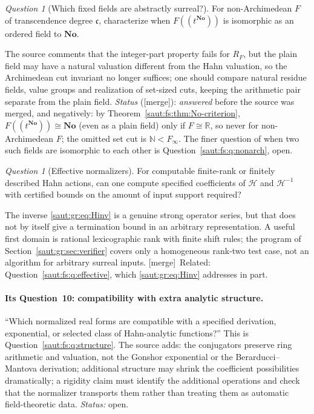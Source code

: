 \documentclass[11pt]{article}
\theoremstyle{definition}
\theoremstyle{remark}
\newtheorem{question}[theorem]{Question}
\newcommand{\No}{\mathbf{No}}
\newcommand{\R}{\mathbb R}
\newcommand{\N}{\mathbb N}
\newcommand{\cc}{\mathfrak c}
\newcommand{\mergetag}{\textup{[merge]}}
\numberwithin{equation}{section}
\begin{document}
\begin{question}[Which fixed fields are abstractly surreal?]\label{saut:gr:q:abstract}
For non-Archimedean $F$ of transcendence degree $\cc$, characterize when $F((t^{\No}))$
is isomorphic as an ordered field to $\No$.
\end{question}
The source comments that the integer-part property fails for $R_F$, but the plain field
may have a natural valuation different from the Hahn valuation, so the Archimedean cut
invariant no longer suffices; one should compare natural residue fields, value groups
and realization of set-sized cuts, keeping the arithmetic pair separate from the plain
field. \emph{Status} (\mergetag): \emph{answered} before the source was merged, and
negatively: by Theorem~\ref{saut:fs:thm:No-criterion}, $F((t^{\No}))\cong\No$ (even as a
plain field) only if $F\cong\R$, so never for non-Archimedean $F$; the omitted set cut is
$\N<F_\infty$. The finer question of when two such fields are isomorphic to each other is
Question~\ref{saut:fs:q:nonarch}, open.

\begin{question}[Effective normalizers]\label{saut:gr:q:effective}
For computable finite-rank or finitely described Hahn actions, can one compute specified
coefficients of $\mathcal H$ and $\mathcal H^{-1}$ with certified bounds on the amount of
input support required?
\end{question}
The inverse \eqref{saut:gr:eq:Hinv} is a genuine strong operator series, but that does not
by itself give a termination bound in an arbitrary representation. A useful first domain
is rational lexicographic rank with finite shift rules; the program of
Section~\ref{saut:gr:sec:verifier} covers only a homogeneous rank-two test case, not an
algorithm for arbitrary surreal inputs. \mergetag\ Related:
Question~\ref{saut:fs:q:effective}, which \eqref{saut:gr:eq:Hinv} addresses in part.

\paragraph{Its Question~10: compatibility with extra analytic structure.} ``Which
normalized real forms are compatible with a specified derivation, exponential, or selected
class of Hahn-analytic functions?'' This is Question~\ref{saut:fs:q:structure}. The source
adds: the conjugators preserve ring arithmetic and valuation, not the Gonshor exponential
or the Berarducci--Mantova derivation; additional structure may shrink the coefficient
possibilities dramatically; a rigidity claim must identify the additional operations and
check that the normalizer transports them rather than treating them as automatic
field-theoretic data. \emph{Status:} open.
\end{document}
